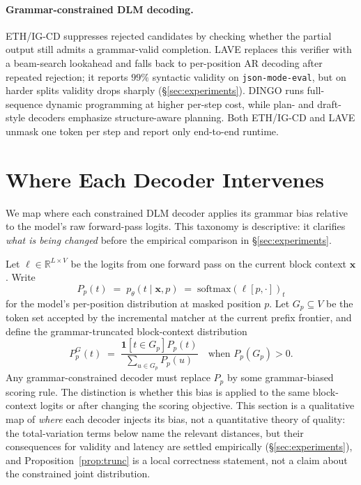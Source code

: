 \documentclass[11pt]{article}
\begin{document}
\paragraph{Grammar-constrained DLM decoding.} ETH/IG-CD \citep{mundler2025} suppresses rejected candidates by checking whether the partial output still admits a grammar-valid completion. LAVE \citep{lave2025} replaces this verifier with a beam-search lookahead and falls back to per-position AR decoding after repeated rejection; it reports $99\%$ syntactic validity on \texttt{json-mode-eval}, but on harder splits validity drops sharply (\S\ref{sec:experiments}). DINGO \citep{dingo2025} runs full-sequence dynamic programming at higher per-step cost, while plan- and draft-style decoders \citep{pvf2026,reddy2026dccd} emphasize structure-aware planning. Both ETH/IG-CD and LAVE unmask one token per step and report only end-to-end runtime.

\section{Where Each Decoder Intervenes}
\label{sec:distortion}

We map where each constrained DLM decoder applies its grammar bias relative to the model's raw forward-pass logits. This taxonomy is descriptive: it clarifies \emph{what is being changed} before the empirical comparison in §\ref{sec:experiments}.

Let $\ell \in \mathbb{R}^{L\times V}$ be the logits from one forward pass on the current block context $\mathbf{x}$. Write
\[
P_p(t) \;=\; p_\theta(t \mid \mathbf{x},p)
      \;=\; \mathrm{softmax}(\ell[p,\cdot])_t
\]
for the model's per-position distribution at masked position $p$. Let $G_p\subseteq V$ be the token set accepted by the incremental matcher at the current prefix frontier, and define the grammar-truncated block-context distribution
\[
P_p^G(t) \;=\;
\frac{\mathbf{1}[t\in G_p]P_p(t)}{\sum_{u\in G_p}P_p(u)}
\quad\text{when }P_p(G_p)>0.
\]
Any grammar-constrained decoder must replace $P_p$ by some grammar-biased scoring rule. The distinction is whether this bias is applied to the same block-context logits or after changing the scoring objective. This section is a qualitative map of \emph{where} each decoder injects its bias, not a quantitative theory of quality: the total-variation terms below name the relevant distances, but their consequences for validity and latency are settled empirically (\S\ref{sec:experiments}), and Proposition~\ref{prop:trunc} is a local correctness statement, not a claim about the constrained joint distribution.
\end{document}
